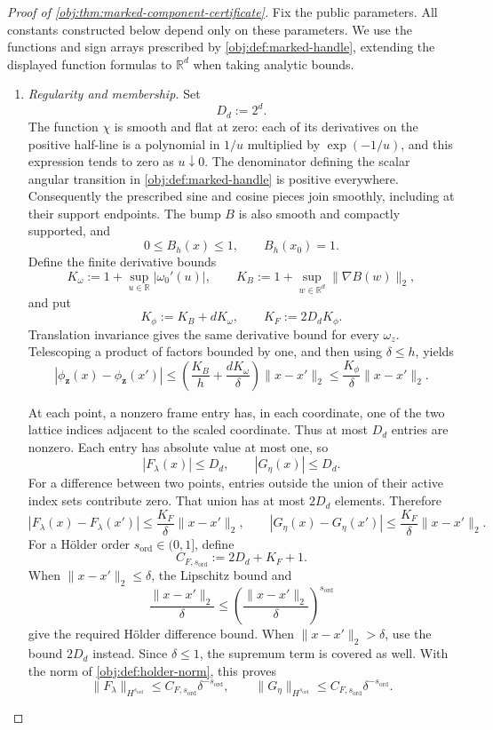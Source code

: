 \documentclass[11pt]{article}
\begin{document}
\begin{proof}[Proof of \cref{obj:thm:marked-component-certificate}]
Fix the public parameters. All constants constructed below depend only on these parameters. We use the functions and sign arrays prescribed by \cref{obj:def:marked-handle}, extending the displayed function formulas to \(\mathbb R^d\) when taking analytic bounds.

\begin{enumerate}
\item \textit{Regularity and membership.}
Set
\[
D_d:=2^d.
\]
The function \(\chi\) is smooth and flat at zero: each of its derivatives on the positive half-line is a polynomial in \(1/u\) multiplied by \(\exp(-1/u)\), and this expression tends to zero as \(u\downarrow0\). The denominator defining the scalar angular transition in \cref{obj:def:marked-handle} is positive everywhere. Consequently the prescribed sine and cosine pieces join smoothly, including at their support endpoints. The bump \(B\) is also smooth and compactly supported, and
\[
0\le B_h(x)\le1,\qquad B_h(x_0)=1.
\]
Define the finite derivative bounds
\[
K_\omega:=1+\sup_{u\in\mathbb R}|\omega_0'(u)|,
\qquad
K_B:=1+\sup_{w\in\mathbb R^d}\|\nabla B(w)\|_2,
\]
and put
\[
K_\phi:=K_B+dK_\omega,
\qquad
K_F:=2D_dK_\phi.
\]
Translation invariance gives the same derivative bound for every \(\omega_z\). Telescoping a product of factors bounded by one, and then using \(\delta\le h\), yields
\[
|\phi_{\mathbf z}(x)-\phi_{\mathbf z}(x')|
\le
\left(\frac{K_B}{h}+\frac{dK_\omega}{\delta}\right)
\|x-x'\|_2
\le
\frac{K_\phi}{\delta}\|x-x'\|_2.
\]

At each point, a nonzero frame entry has, in each coordinate, one of the two lattice indices adjacent to the scaled coordinate. Thus at most \(D_d\) entries are nonzero. Each entry has absolute value at most one, so
\[
|F_\lambda(x)|\le D_d,
\qquad
|G_\eta(x)|\le D_d.
\]
For a difference between two points, entries outside the union of their active index sets contribute zero. That union has at most \(2D_d\) elements. Therefore
\[
|F_\lambda(x)-F_\lambda(x')|
\le \frac{K_F}{\delta}\|x-x'\|_2,
\qquad
|G_\eta(x)-G_\eta(x')|
\le \frac{K_F}{\delta}\|x-x'\|_2.
\]
For a Hölder order \(s_{\mathrm{ord}}\in(0,1]\), define
\[
C_{F,s_{\mathrm{ord}}}:=2D_d+K_F+1.
\]
When \(\|x-x'\|_2\le\delta\), the Lipschitz bound and
\[
\frac{\|x-x'\|_2}{\delta}
\le
\left(\frac{\|x-x'\|_2}{\delta}\right)^{s_{\mathrm{ord}}}
\]
give the required Hölder difference bound. When \(\|x-x'\|_2>\delta\), use the bound \(2D_d\) instead. Since \(\delta\le1\), the supremum term is covered as well. With the norm of \cref{obj:def:holder-norm}, this proves
\[
\|F_\lambda\|_{H^{s_{\mathrm{ord}}}}
\le C_{F,s_{\mathrm{ord}}}\delta^{-s_{\mathrm{ord}}},
\qquad
\|G_\eta\|_{H^{s_{\mathrm{ord}}}}
\le C_{F,s_{\mathrm{ord}}}\delta^{-s_{\mathrm{ord}}}.
\]


\end{enumerate}
\end{proof}
\end{document}
